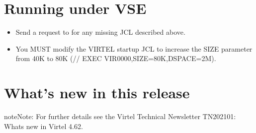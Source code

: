 \documentclass[letterpaper,10pt,english]{sphinxmanual}
\begin{document}
\ignorespaces 

\chapter{Running under VSE}
\label{\detokenize{Migration_Guide:running-under-vse}}\label{\detokenize{Migration_Guide:index-8}}\begin{itemize}
\item {} 
\sphinxAtStartPar
Send a request to  for any missing JCL described above.

\item {} 
\sphinxAtStartPar
You MUST modify the VIRTEL startup JCL to increase the SIZE parameter from 40K to 80K (// EXEC VIR0000,SIZE=80K,DSPACE=2M).

\end{itemize}

\newpage

\ignorespaces 

\chapter{What’s new in this release}
\label{\detokenize{Migration_Guide:what-s-new-in-this-release}}\label{\detokenize{Migration_Guide:index-9}}
\begin{sphinxadmonition}{note}{Note:}
\sphinxAtStartPar
For further details see the Virtel Technical Newsletter TN202101: Whats new in Virtel 4.62.
\end{sphinxadmonition}



\renewcommand{\indexname}{Index}
\printindex
\end{document}

